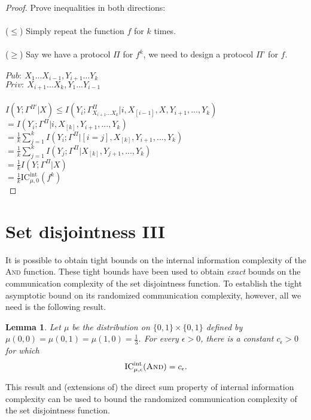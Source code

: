 \documentclass[11pt,oneside]{book}
\theoremstyle{plain}
\newtheorem{lemma}{Lemma}
\theoremstyle{definition}
\theoremstyle{plain}
\newcommand{\ICint}{\mathrm{IC}^{\mathrm{int}}}
\begin{document}
\begin{proof}
Prove inequalities in both directions:\\
 \\
($\leq$) Simply repeat the function $f$ for $k$ times.\\
 \\
($\ge$) Say we have a protocol $\Pi$ for $f^k$, we need to design a protocol $\Pi$' for $f$.\\
 \\
$Pub:\ X_1...X_{i-1}, Y_{i+1}...Y_k$\\
$Priv:\ X_{i+1}...X_k, Y_1...Y_{i-1}$\\
 \\
$I(Y;\Gamma^{\Pi'}|X) \leq I(Y_i;\Gamma^{\Pi}_{X_{i+1}...X_k}|i,X_{[i-1]},X,Y_{i+1},...,Y_k)$\\
$=I(Y_i;\Gamma^{\Pi}|i,X_{[k]},Y_{i+1},...,Y_k)$\\
$=\frac1k\sum_{j=1}^{k}I(Y_i;\Gamma^{\Pi}|[i=j],X_{[k]},Y_{i+1},...,Y_k)$\\
$=\frac1k\sum_{j=1}^{k}I(Y_j;\Gamma^{\Pi}|X_{[k]},Y_{j+1},...,Y_k)$\\
$=\frac1kI(Y;\Gamma^{\Pi}|X)$\\
$=\frac1k\ICint_{\mu,0}(f^k)$\\
\end{proof}


 
\section{Set disjointness III}

It is possible to obtain tight bounds on the internal information complexity of the \textsc{And} function. These tight bounds have been used to obtain \emph{exact} bounds on the communication complexity of the set disjointness function. To establish the tight asymptotic bound on its randomized communication complexity, however, all we need is the following result.

\begin{lemma}
	Let $\mu$ be the distribution on $\{0,1\} \times \{0,1\}$ defined by $\mu(0,0) = \mu(0,1) = \mu(1,0) = \frac13$.
	For every $\epsilon > 0$, there is a constant $c_\epsilon > 0$ for which
	\[
	\ICint_{\mu,\epsilon}(\textsc{And}) = c_\epsilon.
	\]
\end{lemma}

This result and (extensions of) the direct sum property of internal information complexity can be used to bound the randomized communication complexity of the set disjointness function.
\end{document}
